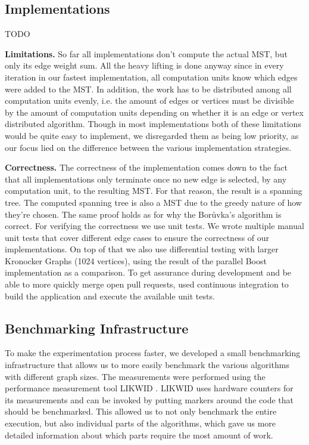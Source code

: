 \documentclass[letterpaper]{article}
\newcommand{\mypar}[1]{{\bf #1.}}
\begin{document}
\subsection{Implementations}
TODO

\mypar{Limitations}
So far all implementations don't compute the actual MST, but only its edge weight sum. All the heavy lifting is done anyway since in every iteration in our fastest implementation, all computation units know which edges were added to the MST. In addition, the work has to be distributed among all computation units evenly, i.e. the amount of edges or vertices must be divisible by the amount of
computation units depending on whether it is an edge or vertex distributed algorithm. Though in most implementations
both of these limitations would be quite easy to implement, we disregarded them as being low priority, as our focus lied
on the difference between the various implementation strategies.

\mypar{Correctness}
The correctness of the implementation comes down to the fact that all implementations only terminate once no new edge is
selected, by any computation unit, to the resulting MST. For that reason, the result is a spanning tree. The computed
spanning tree is also a MST due to the greedy nature of how they're chosen. The same proof holds as for why the
Bor\r{u}vka's algorithm is correct\cite{nevsetvril2012origins}. For verifying the correctness we use unit tests. We
wrote multiple manual unit tests that cover different edge cases to ensure the correctness of our implementations. On
top of that we also use differential testing with larger Kronocker Graphs (1024 vertices), using the result of the
parallel Boost implementation as a comparison. To get assurance during development and be able to more quickly merge
open pull requests, used continuous integration to build the application and execute the available unit tests.

\subsection{Benchmarking Infrastructure}
To make the experimentation process faster, we developed a small benchmarking infrastructure that allows us to more
easily benchmark the various algorithms with different graph sizes. The measurements were performed using the
performance measurement tool LIKWID \cite{treibig2010likwid}. LIKWID uses hardware counters for its measurements and can
be invoked by putting markers around the code that should be benchmarked. This allowed us to not only benchmark the
entire execution, but also individual parts of the algorithms, which gave us more detailed information about which parts
require the most amount of work.
\end{document}
